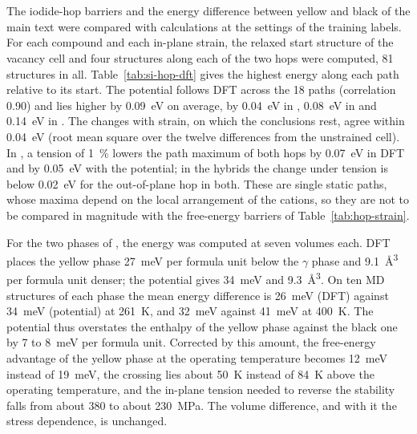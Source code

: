 

\section{\protect{}}
\label{si:strain-dft}
{\changedcolor
The iodide-hop barriers and the energy difference between yellow and black \CsSnI{} of the main text were compared
with \rSCAN{} calculations at the settings of the training labels. For each compound and each in-plane strain, the
relaxed start structure of the vacancy cell and four structures along each of the two hops were computed, 81
structures in all. Table~\ref{tab:si-hop-dft} gives the highest energy along each path relative to its start. The
potential follows DFT across the 18 paths (correlation 0.90) and lies higher by \SI{0.09}{eV} on average, by
\SI{0.04}{eV} in \CsSnI{}, \SI{0.08}{eV} in \MASnI{} and \SI{0.14}{eV} in \FASnI{}. The changes with strain, on which
the conclusions rest, agree within \SI{0.04}{eV} (root mean square over the twelve differences from the unstrained
cell). In \CsSnI{}, a tension of \SI{1}{\percent} lowers the path maximum of both hops by \SI{0.07}{eV} in DFT and by
\SI{0.05}{eV} with the potential; in the hybrids the change under tension is below \SI{0.02}{eV} for the out-of-plane
hop in both. These are single static paths, whose maxima depend on the local arrangement of the cations, so they are
not to be compared in magnitude with the free-energy barriers of Table~\ref{tab:hop-strain}.

For the two phases of \CsSnI{}, the energy was computed at seven volumes each. DFT places the yellow phase
\SI{27}{meV} per formula unit below the $\gamma$ phase and \SI{9.1}{\angstrom^3} per formula unit denser; the potential
gives \SI{34}{meV} and \SI{9.3}{\angstrom^3}. On ten MD structures of each phase the mean energy difference is
\SI{26}{meV} (DFT) against \SI{34}{meV} (potential) at \SI{261}{K}, and \SI{32}{meV} against \SI{41}{meV} at
\SI{400}{K}. The potential thus overstates the enthalpy of the yellow phase against the black one by 7 to
\SI{8}{meV} per formula unit. Corrected by this amount, the free-energy advantage of the yellow phase at the operating
temperature becomes \SI{12}{meV} instead of \SI{19}{meV}, the crossing lies about \SI{50}{K} instead of \SI{84}{K}
above the operating temperature, and the in-plane tension needed to reverse the stability falls from about 380 to
about \SI{230}{MPa}. The volume difference, and with it the stress dependence, is unchanged.
}

